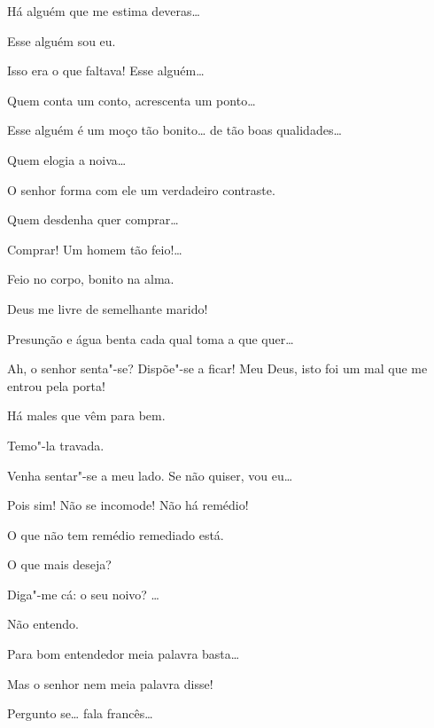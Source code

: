   Há alguém que me estima deveras\ldots{}

  Esse alguém  sou eu.

  Isso era o que faltava!  Esse alguém\ldots{}

  Quem conta um conto, acrescenta um ponto\ldots{}

  Esse alguém é um moço tão bonito\ldots{} de tão boas
qualidades\ldots{}

  Quem elogia a noiva\ldots{}

  O senhor forma com ele um verdadeiro contraste.

  Quem desdenha quer comprar\ldots{}

  Comprar! Um homem tão feio!\ldots{}

  Feio no corpo, bonito na alma.

   Deus me livre de semelhante marido!

  Presunção e água benta cada qual toma a que quer\ldots{}

   Ah, o senhor senta"-se? Dispõe"-se a ficar! Meu
Deus, isto foi um mal que me entrou pela porta!

   Há males que vêm para bem.

  Temo"-la travada.

  Venha sentar"-se a meu lado.  Se não quiser, vou eu\ldots{} 

  Pois sim! Não se incomode!  Não há
remédio!

   O que não tem remédio remediado
está.

  O que mais deseja?

  Diga"-me cá: o seu noivo? \ldots{} 

  Não entendo.

  Para bom entendedor meia palavra basta\ldots{}

  Mas o senhor nem meia palavra disse!

  Pergunto se\ldots{} fala francês\ldots{}

